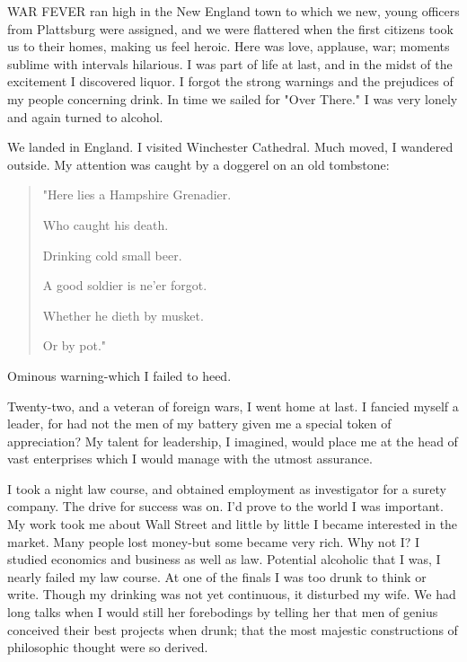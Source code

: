 
\bbChapterPreamble


\begin{biblechapter}
    WAR FEVER ran high in the New England town 
    to which we new, young officers from Plattsburg were assigned, 
    and we were flattered when the first citizens took us to their homes, 
    making us feel heroic.
\verse Here was love, applause, war; 
    moments sublime with intervals hilarious.
\verse I was part of life at last, 
    and in the midst of the excitement I discovered liquor.
\verse I forgot the strong warnings 
    and the prejudices of my people concerning drink.
\verse In time we sailed for "Over There."
\verse I was very lonely and again turned to alcohol.

\verse We landed in England.
\verse I visited Winchester Cathedral.
\verse Much moved, I wandered outside.
\verse My attention was caught by a doggerel on an old tombstone:

\verse\begin{quote}"Here lies a Hampshire Grenadier.
    
    Who caught his death.
    
    Drinking cold small beer.
    
    A good soldier is ne'er forgot.
    
    Whether he dieth by musket.
    
    Or by pot."\end{quote}

\verse Ominous warning-which I failed to heed.

\verse Twenty-two, and a veteran of foreign wars, I went home at last.
\verse I fancied myself a leader, 
    for had not the men of my battery 
    given me a special token of appreciation?
\verse My talent for leadership, I imagined, 
    would place me at the head of vast enterprises 
    which I would manage with the utmost assurance.

\verse I took a night law course, 
    and obtained employment as investigator for a surety company.
\verse The drive for success was on.
\verse I'd prove to the world I was important.
\verse My work took me about Wall Street 
    and little by little I became interested in the market.
\verse Many people lost money-but some became very rich.
\verse Why not I?
\verse I studied economics and business as well as law.
\verse Potential alcoholic that I was, I nearly failed my law course.
\verse At one of the finals I was too drunk to think or write.
\verse Though my drinking was not yet continuous, it disturbed my wife.
\verse We had long talks when I would still her forebodings 
    by telling her that men of genius 
    conceived their best projects when drunk; 
    that the most majestic constructions of philosophic thought 
    were so derived.


\end{biblechapter}
